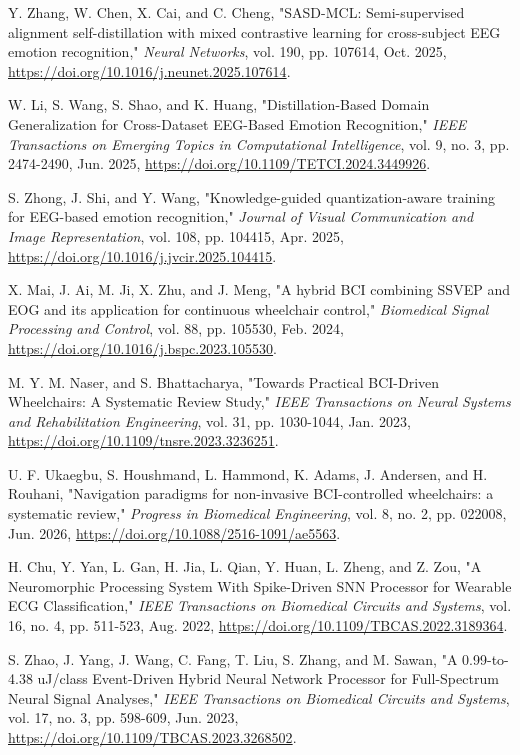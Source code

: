  Y. Zhang, W. Chen, X. Cai, and C. Cheng, "SASD-MCL: Semi-supervised alignment self-distillation with mixed contrastive learning for cross-subject EEG emotion recognition," \textit{Neural Networks}, vol. 190, pp. 107614, Oct. 2025, \url{https://doi.org/10.1016/j.neunet.2025.107614}.

 W. Li, S. Wang, S. Shao, and K. Huang, "Distillation-Based Domain Generalization for Cross-Dataset EEG-Based Emotion Recognition," \textit{IEEE Transactions on Emerging Topics in Computational Intelligence}, vol. 9, no. 3, pp. 2474-2490, Jun. 2025, \url{https://doi.org/10.1109/TETCI.2024.3449926}.

 S. Zhong, J. Shi, and Y. Wang, "Knowledge-guided quantization-aware training for EEG-based emotion recognition," \textit{Journal of Visual Communication and Image Representation}, vol. 108, pp. 104415, Apr. 2025, \url{https://doi.org/10.1016/j.jvcir.2025.104415}.

 X. Mai, J. Ai, M. Ji, X. Zhu, and J. Meng, "A hybrid BCI combining SSVEP and EOG and its application for continuous wheelchair control," \textit{Biomedical Signal Processing and Control}, vol. 88, pp. 105530, Feb. 2024, \url{https://doi.org/10.1016/j.bspc.2023.105530}.

 M. Y. M. Naser, and S. Bhattacharya, "Towards Practical BCI-Driven Wheelchairs: A Systematic Review Study," \textit{IEEE Transactions on Neural Systems and Rehabilitation Engineering}, vol. 31, pp. 1030-1044, Jan. 2023, \url{https://doi.org/10.1109/tnsre.2023.3236251}.

 U. F. Ukaegbu, S. Houshmand, L. Hammond, K. Adams, J. Andersen, and H. Rouhani, "Navigation paradigms for non-invasive BCI-controlled wheelchairs: a systematic review," \textit{Progress in Biomedical Engineering}, vol. 8, no. 2, pp. 022008, Jun. 2026, \url{https://doi.org/10.1088/2516-1091/ae5563}.

 H. Chu, Y. Yan, L. Gan, H. Jia, L. Qian, Y. Huan, L. Zheng, and Z. Zou, "A Neuromorphic Processing System With Spike-Driven SNN Processor for Wearable ECG Classification," \textit{IEEE Transactions on Biomedical Circuits and Systems}, vol. 16, no. 4, pp. 511-523, Aug. 2022, \url{https://doi.org/10.1109/TBCAS.2022.3189364}.

 S. Zhao, J. Yang, J. Wang, C. Fang, T. Liu, S. Zhang, and M. Sawan, "A 0.99-to-4.38 uJ/class Event-Driven Hybrid Neural Network Processor for Full-Spectrum Neural Signal Analyses," \textit{IEEE Transactions on Biomedical Circuits and Systems}, vol. 17, no. 3, pp. 598-609, Jun. 2023, \url{https://doi.org/10.1109/TBCAS.2023.3268502}.

